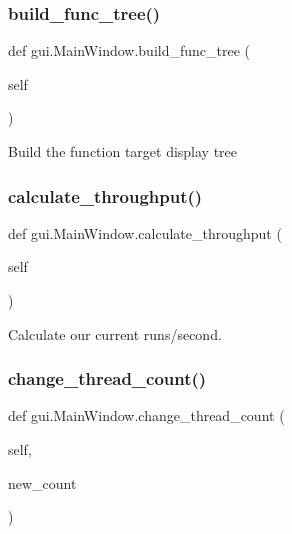 \subsubsection{\texorpdfstring{build\+\_\+func\+\_\+tree()}{build\_func\_tree()}}
{\footnotesize\ttfamily def gui.\+Main\+Window.\+build\+\_\+func\+\_\+tree (\begin{DoxyParamCaption}\item[{}]{self }\end{DoxyParamCaption})}

\begin{DoxyVerb}Build the function target display tree \end{DoxyVerb}
 \mbox{\label{classgui_1_1_main_window_a2a9cd1c91f12072f99ca7106b6345c0e}} 
\subsubsection{\texorpdfstring{calculate\+\_\+throughput()}{calculate\_throughput()}}
{\footnotesize\ttfamily def gui.\+Main\+Window.\+calculate\+\_\+throughput (\begin{DoxyParamCaption}\item[{}]{self }\end{DoxyParamCaption})}

\begin{DoxyVerb}Calculate our current runs/second. \end{DoxyVerb}
 \mbox{\label{classgui_1_1_main_window_a14e3103f94dde6b77a4a0b9303a0cd38}} 
\subsubsection{\texorpdfstring{change\+\_\+thread\+\_\+count()}{change\_thread\_count()}}
{\footnotesize\ttfamily def gui.\+Main\+Window.\+change\+\_\+thread\+\_\+count (\begin{DoxyParamCaption}\item[{}]{self,  }\item[{}]{new\+\_\+count }\end{DoxyParamCaption})}

